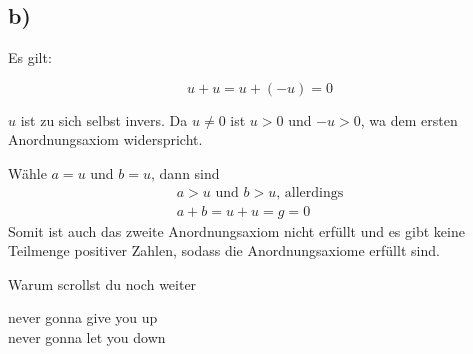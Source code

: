 \documentclass[]{scrartcl}
\begin{document}
\subsection{b)}

Es gilt:

\begin{equation}
	u + u = u + (-u) = 0
\end{equation}

$u$ ist zu sich selbst invers. Da $u\neq 0$ ist $u>0$ und $-u>0$, wa dem ersten Anordnungsaxiom widerspricht.

Wähle $a = u$ und $b=u$, dann sind
\begin{gather}
	a > u \text{ und } b > u \text{, allerdings}\\
	a + b = u + u = g = 0
\end{gather}
Somit ist auch das zweite Anordnungsaxiom nicht erfüllt und es gibt keine Teilmenge positiver Zahlen, sodass die Anordnungsaxiome erfüllt sind.

\newpage

\newpage

Warum scrollst du noch weiter

\newpage

\newpage

never gonna give you up\\
never gonna let you down
\end{document}
